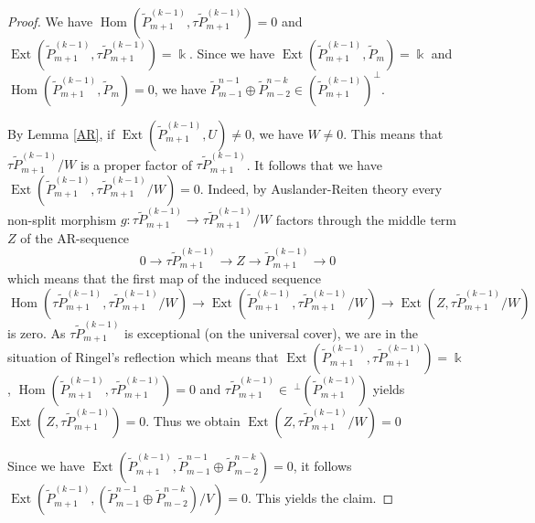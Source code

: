 \documentclass{amsart}
\newcommand{\kk}{\Bbbk}
\newcommand{\Ext}{\operatorname{Ext}}
\newcommand{\Hom}{\operatorname{Hom}}
\newcommand{\ses}[3]{0\rightarrow #1\rightarrow #2\rightarrow#3\rightarrow 0}
\begin{document}
\begin{proof}

We have $\Hom(\tilde P_{m+1}^{(k-1)},\tau \tilde P_{m+1}^{(k-1)})=0$ and $\Ext(\tilde P_{m+1}^{(k-1)},\tau \tilde P_{m+1}^{(k-1)})=\kk$. Since we have $\Ext(\tilde P_{m+1}^{(k-1)},\tilde P_m)=\kk$ and $\Hom(\tilde P_{m+1}^{(k-1)},\tilde P_m)=0$, we have $\tilde P_{m-1}^{n-1}\oplus \tilde P_{m-2}^{n-k}\in (\tilde P_{m+1}^{(k-1)})^\perp$.

By Lemma \ref{AR}, if $\Ext(\tilde P_{m+1}^{(k-1)},U)\neq 0$, we have $W\neq 0$. This means that $\tau\tilde P_{m+1}^{(k-1)}/W$ is a proper factor of $\tau \tilde P_{m+1}^{(k-1)}$. 
It follows that we have $\Ext(\tilde P_{m+1}^{(k-1)},\tau\tilde P_{m+1}^{(k-1)}/W)=0$. Indeed, by Auslander-Reiten theory every non-split morphism $g:\tau\tilde P_{m+1}^{(k-1)}\to \tau\tilde P_{m+1}^{(k-1)}/W$ factors through the middle term $Z$ of the AR-sequence 
\[\ses{\tau\tilde P_{m+1}^{(k-1)}}{Z}{\tilde P_{m+1}^{(k-1)}}\]
which means that the first map of the induced sequence
\[\Hom(\tau\tilde P_{m+1}^{(k-1)},\tau\tilde P_{m+1}^{(k-1)}/W)\to\Ext(\tilde P_{m+1}^{(k-1)},\tau\tilde P_{m+1}^{(k-1)}/W)\to\Ext(Z,\tau\tilde P_{m+1}^{(k-1)}/W) \]
is zero. As $\tau\tilde P_{m+1}^{(k-1)}$ is exceptional (on the universal cover), we are in the situation of Ringel's reflection \cite{rin} which means that $\Ext(\tilde P_{m+1}^{(k-1)},\tau\tilde P_{m+1}^{(k-1)})=\kk$, $\Hom(\tilde P_{m+1}^{(k-1)},\tau\tilde P_{m+1}^{(k-1)})=0$ and $\tau\tilde P_{m+1}^{(k-1)}\in ~^\perp(\tilde P_{m+1}^{(k-1)})$ yields $\Ext(Z,\tau\tilde P_{m+1}^{(k-1)})=0$. Thus we obtain $\Ext(Z,\tau\tilde P_{m+1}^{(k-1)}/W)=0$

Since we have $\Ext(\tilde P_{m+1}^{(k-1)},\tilde P_{m-1}^{n-1}\oplus \tilde P_{m-2}^{n-k})=0$, it follows $\Ext(\tilde P_{m+1}^{(k-1)},(\tilde P_{m-1}^{n-1}\oplus \tilde P_{m-2}^{n-k})/V)=0$. This yields the claim.


\end{proof}
\end{document}
